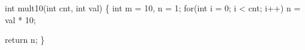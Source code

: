 \begin{minipage}{2in}
\begin{AVerb}[gobble=2,numbers=left]
  int mult10(int cnt, int val) \{ 
    int m = 10, n = 1; 
    for(int i = 0; i < cnt; i++)
      n = val * 10; \label{fig_back7_opt_loop}

    return n;
  \}
\end{AVerb}
\end{minipage}

